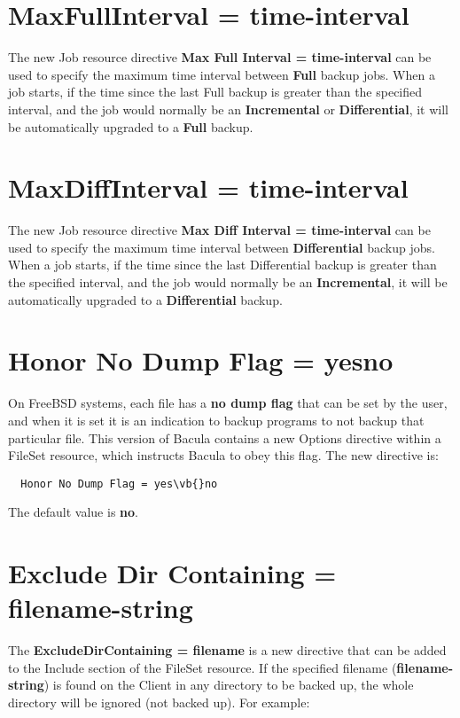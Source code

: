 \section{MaxFullInterval = \lt{}time-interval\gt{}}
The new Job resource directive {\bf Max Full Interval = \lt{}time-interval\gt{}}
can be used to specify the maximum time interval between {\bf Full} backup
jobs. When a job starts, if the time since the last Full backup is
greater than the specified interval, and the job would normally be an
{\bf Incremental} or {\bf Differential}, it will be automatically
upgraded to a {\bf Full} backup.

\section{MaxDiffInterval = \lt{}time-interval\gt{}}
The new Job resource directive {\bf Max Diff Interval = \lt{}time-interval\gt{}}
can be used to specify the maximum time interval between {\bf Differential} backup
jobs. When a job starts, if the time since the last Differential backup is
greater than the specified interval, and the job would normally be an
{\bf Incremental}, it will be automatically
upgraded to a {\bf Differential} backup.

\section{Honor No Dump Flag = \lt{}yes\vb{}no\gt{}}
On FreeBSD systems, each file has a {\bf no dump flag} that can be set
by the user, and when it is set it is an indication to backup programs
to not backup that particular file.  This version of Bacula contains a
new Options directive within a FileSet resource, which instructs Bacula to
obey this flag.  The new directive is:

\begin{verbatim}
  Honor No Dump Flag = yes\vb{}no
\end{verbatim}

The default value is {\bf no}.


\section{Exclude Dir Containing = \lt{}filename-string\gt{}}
The {\bf ExcludeDirContaining = \lt{}filename\gt{}} is a new directive that
can be added to the Include section of the FileSet resource.  If the specified
filename ({\bf filename-string}) is found on the Client in any directory to be
backed up, the whole directory will be ignored (not backed up).  For example:

